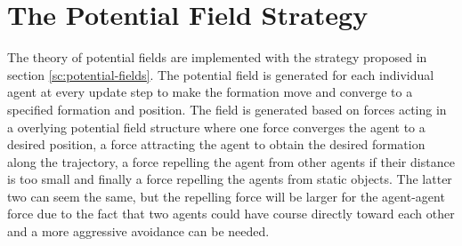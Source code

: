\section{The Potential Field Strategy}
The theory of potential fields are implemented with the strategy
proposed in section \ref{sc:potential-fields}. The potential field is
generated for each individual agent at every update step to make the
formation move and converge to a specified formation and position. The
field is generated based on forces acting in a overlying potential
field structure where one force converges the agent to a desired
position, a force attracting the agent to obtain the desired formation
along the trajectory, a force repelling the agent from other agents if
their distance is too small and finally a force repelling the agents
from static objects. The latter two can seem the same, but the
repelling force will be larger for the agent-agent force due to the
fact that two agents could have course directly toward each other and
a more aggressive avoidance can be needed.

